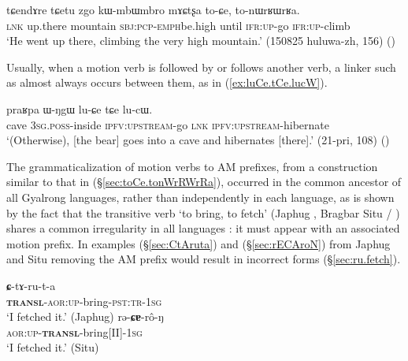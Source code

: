 \begin{exe}
 \ex  \label{sec:toCe.tonWrRWrRa}
\gll tɕendɤre tɕetu zgo kɯ-mbɯ\redp{}mbro mɤɕtʂa to-ɕe, to-nɯrʁɯrʁa. \\
\textsc{lnk} up.there mountain \textsc{sbj}:\textsc{pcp}-\textsc{emph}\redp{}be.high until \textsc{ifr}:\textsc{up}-go \textsc{ifr}:\textsc{up}-climb \\
\glt `He went up there, climbing the very high mountain.' (150825 huluwa-zh, 156) ()
\end{exe}

Usually, when a motion verb is followed by or follows another verb, a linker such as  almost always occurs between them, as in (\ref{ex:luCe.tCe.lucW}).

\begin{exe}
	\ex  \label{ex:luCe.tCe.lucW}
	\gll praʁpa ɯ-ŋgɯ lu-ɕe tɕe lu-cɯ. \\
	cave \textsc{3sg}.\textsc{poss}-inside \textsc{ipfv}:\textsc{upstream}-go \textsc{lnk} \textsc{ipfv}:\textsc{upstream}-hibernate \\
	\glt `(Otherwise), [the bear] goes into a cave and hibernates [there].' (21-pri, 108)
()
\end{exe}

The grammaticalization of motion verbs to AM prefixes, from a construction similar to that in (§\ref{sec:toCe.tonWrRWrRa}), occurred in the common ancestor of all Gyalrong languages, rather than independently in each language, as is shown by the fact that the transitive verb `to bring, to fetch' (Japhug , Bragbar Situ  / ) shares a common irregularity in all languages \citep{jacques13harmonization}: it must appear with an associated motion prefix. In examples (§\ref{sec:CtAruta}) and (§\ref{sec:rECAroN}) from Japhug and Situ removing the AM prefix would result in incorrect forms (§\ref{sec:ru.fetch}).

\begin{exe}
 \ex  \label{sec:CtAruta}
 \gll  \textbf{ɕ}-tɤ-ru-t-a  \\
 \textbf{\textsc{transl}}-\textsc{aor}:\textsc{up}-bring-\textsc{pst}:\textsc{tr}-1\textsc{sg} \\
 \glt `I fetched it.' (Japhug)
 \ex  \label{sec:rECAroN}
 \gll   rə-\textbf{ɕɐ}-rô-ŋ  \\
\textsc{aor}:\textsc{up}-\textbf{\textsc{transl}}-bring[II]-1\textsc{sg} \\
\glt `I fetched it.' (Situ)
\end{exe}

